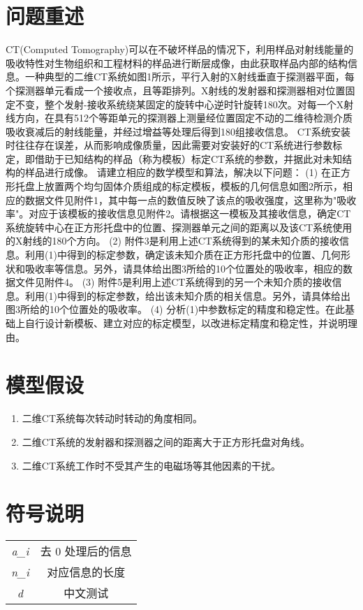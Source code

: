 \documentclass[bwprint]{cumcmthesis}
\begin{document}
\section{问题重述}
CT(Computed Tomography)可以在不破坏样品的情况下，利用样品对射线能量的吸收特性对生物组织和工程材料的样品进行断层成像，由此获取样品内部的结构信息。一种典型的二维CT系统如图1所示，平行入射的X射线垂直于探测器平面，每个探测器单元看成一个接收点，且等距排列。X射线的发射器和探测器相对位置固定不变，整个发射-接收系统绕某固定的旋转中心逆时针旋转180次。对每一个X射线方向，在具有512个等距单元的探测器上测量经位置固定不动的二维待检测介质吸收衰减后的射线能量，并经过增益等处理后得到180组接收信息。
CT系统安装时往往存在误差，从而影响成像质量，因此需要对安装好的CT系统进行参数标定，即借助于已知结构的样品（称为模板）标定CT系统的参数，并据此对未知结构的样品进行成像。
请建立相应的数学模型和算法，解决以下问题：
(1) 在正方形托盘上放置两个均匀固体介质组成的标定模板，模板的几何信息如图2所示，相应的数据文件见附件1，其中每一点的数值反映了该点的吸收强度，这里称为"吸收率"。对应于该模板的接收信息见附件2。请根据这一模板及其接收信息，确定CT系统旋转中心在正方形托盘中的位置、探测器单元之间的距离以及该CT系统使用的X射线的180个方向。
(2) 附件3是利用上述CT系统得到的某未知介质的接收信息。利用(1)中得到的标定参数，确定该未知介质在正方形托盘中的位置、几何形状和吸收率等信息。另外，请具体给出图3所给的10个位置处的吸收率，相应的数据文件见附件4。
(3) 附件5是利用上述CT系统得到的另一个未知介质的接收信息。利用(1)中得到的标定参数，给出该未知介质的相关信息。另外，请具体给出图3所给的10个位置处的吸收率。
(4) 分析(1)中参数标定的精度和稳定性。在此基础上自行设计新模板、建立对应的标定模型，以改进标定精度和稳定性，并说明理由。

\section{模型假设}
\begin{enumerate}
	\item 二维CT系统每次转动时转动的角度相同。
	\item 二维CT系统的发射器和探测器之间的距离大于正方形托盘对角线。
	\item 二维CT系统工作时不受其产生的电磁场等其他因素的干扰。
\end{enumerate}



\section{符号说明}
\begin{tabular}{cc}
	\hline
	\makebox[0.3\textwidth][l]{符号}	&  \makebox[0.6\textwidth][l]{定义} \\ \hline
	\textit{a_{i}}	    & 去 0 处理后的信息\\ \hline
	\textit{n_{i}}	    & 对应信息的长度 \\ \hline
	\textit{d}	        & 中文测试 \\ \hline
\end{tabular}
\end{document}
